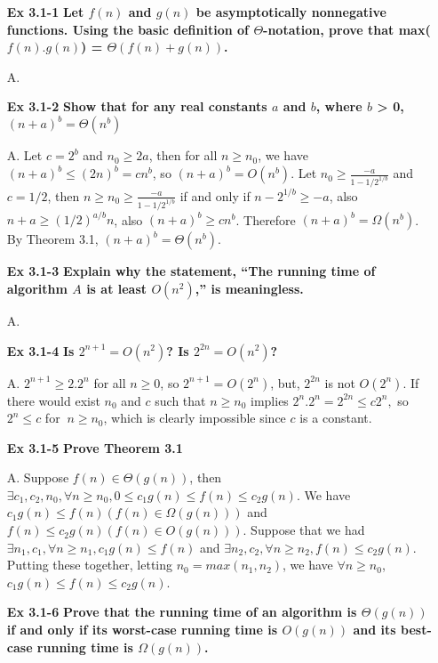 \documentclass[fontsize=12pt,paper=a4,open=any]{book}
\begin{document}
\begin{enumerate}
	\item[\textbf{Ex 3.1-1}]
		\textbf{Let $f(n)$ and $g(n)$ be asymptotically nonnegative functions. Using the basic definition of $\Theta$-notation, prove that max($f(n).g(n)$) = $\Theta(f(n)+g(n))$.}
	\item[A.]
	
	\item[\textbf{Ex 3.1-2}]
	\textbf{Show that for any real constants $a$ and $b$, where $b$ > 0,\\
	$(n+a)^b = \Theta(n^b)$}
	\item[A.]
	Let $c = 2^b$ and $n_0 \geq 2a$, then for all $n \geq n_0$, we have $(n+a)^b \leq (2n)^b = cn^b$, so $(n+a)^b = O(n^b)$. Let $n_0 \geq \frac{-a}{1-1/2^{1/b}}$ and $c = 1/2$, then $n \geq n_0 \geq \frac{-a}{1-1/2^{1/b}}$ if and only if $n-2^{1/b} \geq -a$, also $n+a \geq (1/2)^{a/b}n$, also $(n+a)^b \geq cn^b$. Therefore $(n+a)^b = \Omega(n^b)$. By Theorem 3.1, $(n+a)^b = \Theta(n^b)$.
	
	\item[\textbf{Ex 3.1-3}]
		\textbf{Explain why the statement, “The running time of algorithm $A$ is at least $O(n^2)$,” is meaningless.}
	\item[A.]
	
	\item[\textbf{Ex 3.1-4}]
		\textbf{Is $2^{n+1} = O(n^2)$? Is $2^{2n} = O(n^2)$?}
	\item[A.]
	$2^{n+1} \geq 2 . 2^n$ for all $n \geq 0$, so $2^{n+1} = O(2^n)$, but, $2^{2n}$ is not $O(2^n)$. If there would exist $n_0$ and $c$ such that $n \geq n_0$ implies $2^n . 2^n = 2^{2n} \leq c2^n,$ so $2^n \leq c$ for $\ n \geq n_0$, which is clearly impossible since $c$ is a constant.
	
	\item[\textbf{Ex 3.1-5}]
		\textbf{Prove Theorem 3.1}
	\item[A.]
	Suppose $f(n) \in \Theta(g(n))$, then $\exists c_1, c_2, n_0, \forall n \geq n_0, 0 \leq c_1g(n) \leq f(n) \leq c_2g(n)$. We have $c_1g(n) \leq f(n)(f(n) \in \Omega(g(n)))$ and $f(n) \leq c_2g(n)(f(n) \in O(g(n)))$.
Suppose that we had $\exists n_1, c_1, \forall n \geq n_1, c_1g(n) \leq f(n)$ and $\exists n_2,c_2,\forall n \geq n_2, f(n) \leq c_2g(n)$. Putting these together, letting $n_0 = max(n_1,n_2)$, we have $\forall n \geq n_0$, $c_1g(n) \leq f(n) \leq c_2g(n)$.

	\item[\textbf{Ex 3.1-6}]
	\textbf{Prove that the running time of an algorithm is $\Theta(g(n))$ if and only if its worst-case running time is $O(g(n))$ and its best-case running time is $\Omega(g(n))$.}
	

\end{enumerate}
\end{document}
